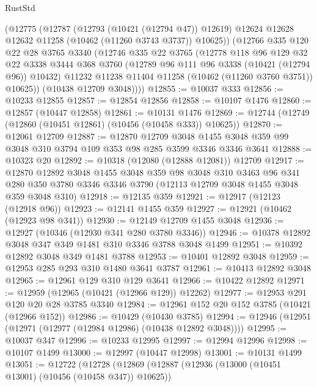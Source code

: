 \begin{lexlean}{RustStd}
\begin{coremodule}
        (@12775
          (@12787
            (@12793 (@10421 (@12794 @47)) @12619)
            @12624
            @12628
            @12632
            @11258
            (@10462 (@11260 @3743 @3737))
            @10625))
        (@12766
          @335
          @120
          @22
          @28
          @3765
          @3340
          (@12746
            @335
            @22
            @3765
            (@12778
              @118
              @96
              @129
              @32
              @22
              @3338
              @3444
              @368
              @3760
              (@12789 @96 @111 @96 @3338 (@10421 (@12794 @96)) @10432)
              @11232
              @11238
              @11404
              @11258
              (@10462 (@11260 @3760 @3751))
              @10625))
          (@10438 @12709 @3048))))
@12855 := @10037 @333
@12856 := @10233 @12855
@12857 := @12854 @12856
@12858 := @10107 @1476
@12860 := @12857 (@10447 @12858)
@12861 := @10131 @1476
@12869 := @12744 (@12749 (@12860 (@10451 @12861) (@10456 (@10458 @333)) @10625))
@12870 := @12061 @12709
@12887 := @12870
    @12709
    @3048
    @1455
    @3048
    @359
    @99
    @3048
    @310
    @3794
    @109
    @353
    @98
    @285
    @3599
    @3346
    @3346
    @3641
@12888 := @10323 @20
@12892 := @10318 (@12080 (@12888 @12081)) @12709
@12917 := @12870
    @12892
    @3048
    @1455
    @3048
    @359
    @98
    @3048
    @310
    @3463
    @96
    @341
    @280
    @350
    @3780
    @3346
    @3346
    @3790
    (@12113 @12709 @3048 @1455 @3048 @359 @3048 @310)
@12918 := @12135 @359
@12921 := @12917 (@12123 (@12918 @96))
@12923 := @12141 @1455 @359
@12927 := @12921 (@10462 (@12923 @98 @341))
@12930 := @12149 @12709 @1455 @3048
@12936 := @12927 (@10346 (@12930 @341 @280 @3780 @3346))
@12946 := @10378 @12892 @3048 @347 @349 @1481 @310 @3346 @3788 @3048 @1499
@12951 := @10392 @12892 @3048 @349 @1481 @3788
@12953 := @10401 @12892 @3048
@12959 := @12953 @285 @293 @310 @1480 @3641 @3787
@12961 := @10413 @12892 @3048
@12965 := @12961 @129 @310 @129 @3641
@12966 := @10422 @12892
@12971 := @12959 (@12965 (@10421 (@12966 @129)) @12262)
@12977 := @12953 @291 @120 @20 @28 @3785 @3340
@12984 := @12961 @152 @20 @152 @3785 (@10421 (@12966 @152))
@12986 := @10429 (@10430 @3785)
@12994 := @12946 (@12951 (@12971 (@12977 (@12984 @12986) (@10438 @12892 @3048))))
@12995 := @10037 @347
@12996 := @10233 @12995
@12997 := @12994 @12996
@12998 := @10107 @1499
@13000 := @12997 (@10447 @12998)
@13001 := @10131 @1499
@13051 := @12722
    (@12728
      (@12869
        (@12887
          (@12936 (@13000 (@10451 @13001) (@10456 (@10458 @347)) @10625))

\end{coremodule}
\end{lexlean}
